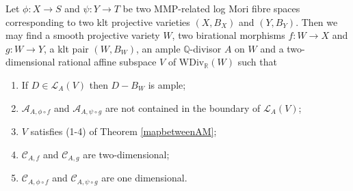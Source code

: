 \begin{lemma}\label{keylemma}
  \cite[Lemma 4.1]{haconSarkisovProgram2012} Let $ \phi: X \to S $ and $ \psi: Y\to T  $ be two MMP-related log Mori fibre spaces corresponding to two klt projective varieties $ (X, B_X) $ and $ (Y, B_Y) $. Then we may find a smooth projective variety $ W $, two birational morphisms $ f:W\to X $ and $ g:W\to Y $, a klt pair $ (W,B_{W}) $, an ample $ \mathbb{Q} $-divisor $ A $ on $ W $ and a two-dimensional rational affine subspace $ V $ of $ \mathrm{WDiv}_{\mathbb{R}}(W) $ such that
  \begin{enumerate}
    \item If $ D\in \mathcal{L}_A(V) $ then $ D-B_W $ is ample;
    \item $ \mathcal{A}_{A,\phi\circ f} $ and $ \mathcal{A}_{A,\psi\circ g} $ are not contained in the boundary of $ \mathcal{L}_A(V) $;
    \item $ V $ satisfies (1-4) of Theorem \ref{mapbetweenAM};
    \item $ \mathcal{C}_{A,f} $ and $ \mathcal{C}_{A,g} $ are two-dimensional;
    \item $ \mathcal{C}_{A,\phi\circ f} $ and $ \mathcal{C}_{A,\psi\circ g} $ are one dimensional.
  \end{enumerate}
\end{lemma}

